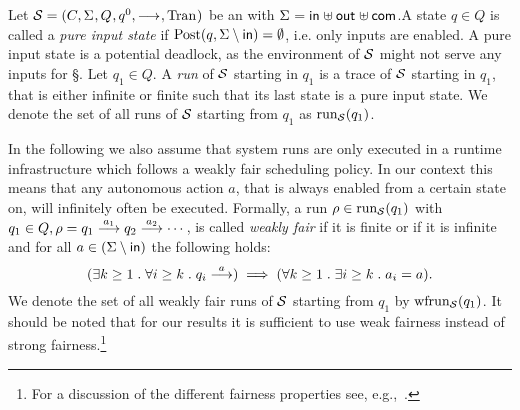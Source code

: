 Let $\S = \aiotstup{}$ be an \AIOTS with $\ioalpha{}$.\linebreak A state $q \in Q$ is called a \emph{pure input state} if $\post(q, \Sigma \setminus \inset) = \emptyset$, i.e. only inputs are enabled. A pure input state is a potential deadlock, as the environment of $\S$ might not serve any inputs for \S. 
Let $q_1 \in Q$. A \emph{run} of $\S$ starting in $q_1$ is a trace of $\S$ starting in $q_1$, that is either infinite or finite such that its last state is a pure input state. We denote the set of all runs of $\S$ starting from $q_1$ as $\run{\S}(q_1)$. 

In the following we also assume that system runs are only executed in a runtime infrastructure which follows a weakly fair scheduling policy. In our context this means that any autonomous action $a$, that is always enabled from a certain state on, will infinitely often be executed. Formally,
a run $\rho \in \run{\S}(q_1)$ with $q_1 \in Q, \rho = q_1 \goes{a_1} q_2 \goes{a_2} \cdots$, is called \emph{weakly fair} if it is finite or if it is infinite and for all $a \in (\Sigma \setminus \inset)$ the following holds:
\[
    (\exists k \geq 1\;.\; \forall i \geq k \;.\; q_i \goes{a} ) \implies (\forall k \geq 1 \;.\; \exists i \geq k \;.\; a_i = a).\]
We denote the set of all weakly fair runs of $\S$ starting from $q_1$ by $\frun{\S}(q_1)$.
It should be noted that for our results it is sufficient to use weak fairness instead of strong fairness.\footnote{For a discussion of the different fairness properties see, e.g.,~\cite{berard-et-al-2001}.}

